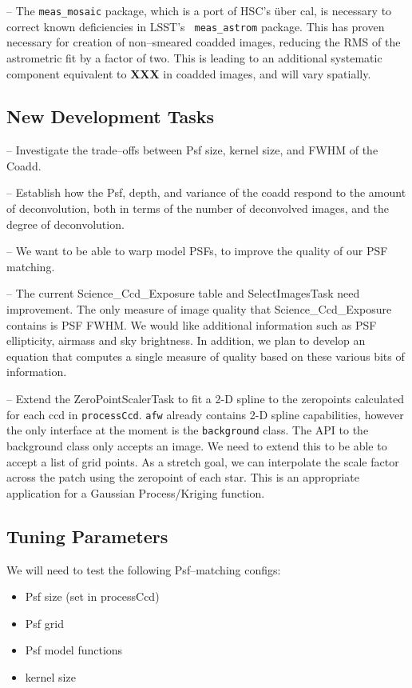 \documentclass[12pt]{article}
\begin{document}
-- The {\tt meas\_mosaic} package, which is a port of HSC's \"{u}ber
cal, is necessary to correct known deficiencies in LSST's {\tt
  meas\_astrom} package.  This has proven necessary for creation of
non--smeared coadded images, reducing the RMS of the astrometric fit
by a factor of two.  This is leading to an additional systematic
component equivalent to {\bf XXX} in coadded images, and will vary
spatially.

\subsection{New Development Tasks}

-- Investigate the trade--offs between Psf size, kernel size, and FWHM
of the Coadd.

-- Establish how the Psf, depth, and variance of the coadd respond to
the amount of deconvolution, both in terms of the number of
deconvolved images, and the degree of deconvolution.

-- We want to be able to warp model PSFs, to improve the quality of our PSF matching.

-- The current Science\_Ccd\_Exposure table and SelectImagesTask need improvement.
The only measure of image quality that Science\_Ccd\_Exposure contains is PSF FWHM.
We would like additional information such as PSF ellipticity, airmass and sky brightness.
In addition, we plan to develop an equation that computes a single measure of quality
based on these various bits of information.

--  Extend the ZeroPointScalerTask to fit a 2-D spline to the zeropoints calculated for each ccd in {\tt processCcd}.   {\tt afw} already contains 2-D spline capabilities, however the only interface at the moment is the {\tt background} class. The API to the background class only accepts an image. We need to extend this  to be able to accept a list of grid points.   As a stretch goal, we can  interpolate the scale factor across the patch using the zeropoint of each star. This is an appropriate application for a Gaussian Process/Kriging function. 

\subsection{Tuning Parameters}
We will need to test the following Psf--matching configs:
\begin{itemize}
\item Psf size (set in processCcd)
\item Psf grid 
\item Psf model functions
\item kernel size
\end{itemize}
\end{document}

